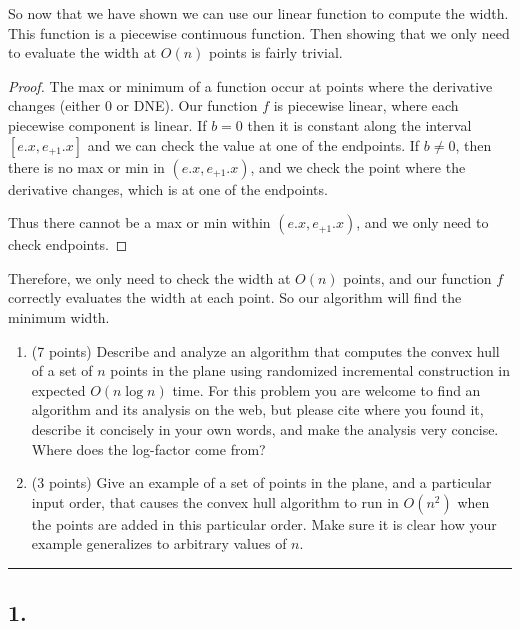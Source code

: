 \documentclass[11pt]{article}
\begin{document}
So now that we have shown we can use our linear function to compute the width. 
This function is a piecewise continuous function. 
Then showing that we only need to evaluate the width at $O(n)$ points is fairly trivial.

\begin{proof}
    
    The max or minimum of a function occur at points where the derivative changes (either 0 or DNE).
    Our function $f$ is piecewise linear, where each piecewise component is linear.
    If $b = 0$ then it is constant along the interval $[e.x, e_{+1}.x]$ and we can check the value at one of the endpoints.
    If $b \neq 0$, then there is no max or min in $(e.x, e_{+1}.x)$, and we check the point where the derivative changes,
    which is at one of the endpoints.

    Thus there cannot be a max or min within $(e.x, e_{+1}.x)$, and we only need to check endpoints. 
\end{proof}

Therefore, we only need to check the width at $O(n)$ points, and our function $f$ correctly evaluates the width 
at each point. So our algorithm will find the minimum width. 



\begin{enumerate}

    \item (7 points) Describe and analyze an algorithm that computes the
        convex hull of a set of $n$ points in the plane using randomized
        incremental construction in expected $O(n \log n)$ time. For this
        problem you are welcome to find an algorithm and its analysis on the
        web, but please cite where you found it, describe it concisely in
        your own words, and make the analysis very concise. Where does the
        log-factor come from?

    \item (3 points) Give an example of a set of points in the plane, and a
        particular input order, that causes the convex hull algorithm to run in
        $O(n^2)$ when the points are added in this particular order. Make sure it
        is clear how your example generalizes to arbitrary values of $n$.

\end{enumerate}
\hrule

\subsection*{1. }
\end{document}
